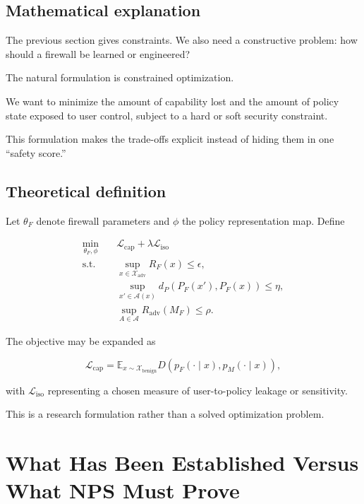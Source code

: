 \documentclass[11pt]{article}
\newcommand{\X}{\mathcal{X}}
\newcommand{\A}{\mathcal{A}}
\newcommand{\E}{\mathbb{E}}
\begin{document}
\subsection*{Mathematical explanation}

The previous section gives constraints. We also need a constructive problem:
how should a firewall be learned or engineered?

The natural formulation is constrained optimization.

We want to minimize the amount of capability lost and the amount of policy
state exposed to user control, subject to a hard or soft security constraint.

This formulation makes the trade-offs explicit instead of hiding them in one
``safety score.''

\subsection*{Theoretical definition}

Let $\theta_F$ denote firewall parameters and $\phi$ the policy representation
map. Define

\begin{equation}
\boxed{
\begin{aligned}
\min_{\theta_F,\phi}\quad&
\mathcal L_{\mathrm{cap}}
+
\lambda\mathcal L_{\mathrm{iso}}
\\[3pt]
\text{s.t.}\quad&
\sup_{x\in\X_{\mathrm{adv}}}R_F(x)\leq\epsilon,
\\
&
\sup_{x'\in\A(x)}
d_P(P_F(x'),P_F(x))
\leq\eta,
\\
&
\sup_{A\in\mathcal A}
R_{\mathrm{adv}}(M_F)
\leq\rho.
\end{aligned}
}
\end{equation}

The objective may be expanded as

\begin{equation}
\mathcal L_{\mathrm{cap}}
=
\E_{x\sim\X_{\mathrm{benign}}}
D\!\left(
p_F(\cdot\mid x),
p_M(\cdot\mid x)
\right),
\end{equation}

with $\mathcal L_{\mathrm{iso}}$ representing a chosen measure of
user-to-policy leakage or sensitivity.

This is a research formulation rather than a solved optimization problem.

\section{What Has Been Established Versus What NPS Must Prove}
\end{document}
